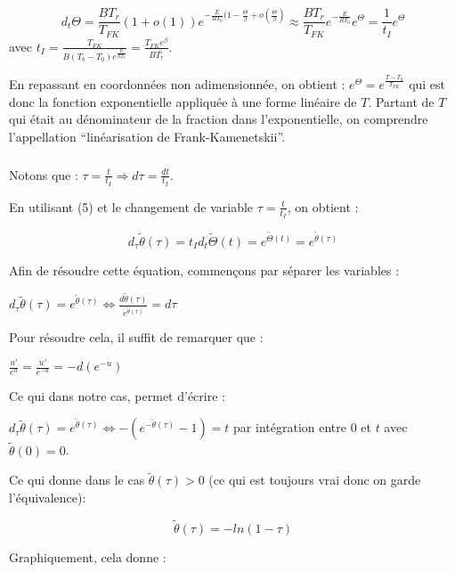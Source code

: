 \documentclass[10pt,a4paper,twocolumn]{report}
\begin{document}
$$ d_t\Theta = \frac{BT_r}{T_{FK}}(1+o(1))e^{-\frac{E}{RT_0}(1-\frac{\Theta}{\beta} + o(\frac{\Theta}{\beta})} \approx \frac{BT_r}{T_{FK}} e^{-\frac{E}{RT_0}} e^{\Theta} = \frac{1}{t_I}e^{\Theta} $$
avec $t_I = \frac{T_{FK}}{B(T_b-T_0)e^{\frac{E}{RT_0}}} = \frac{T_{FK}e^{\beta}}{B\bar{T_r}} $.

En repassant en coordonnées non adimensionnée, on obtient : $e^{\Theta} = e^{\frac{T-T_0}{T_{FK}}}$ qui est donc la fonction exponentielle appliquée à une forme linéaire de $T$. Partant de $T$ qui était au dénominateur de la fraction dans l'exponentielle, on comprendre l'appellation “linéarisation de Frank-Kamenetskii”.

\subsubsection{} %

Notons que : $\tau = \frac{t}{t_I} \Rightarrow d\tau = \frac{dt}{t_I} $.

En utilisant (5) et le changement de variable $\tau = \frac{t}{t_I}$, on obtient : 

$$ d_{\tau}\tilde{\theta}(\tau) = t_I d_{t}\tilde{\Theta}(t) = e^{\tilde{\Theta}(t)} = e^{\tilde{\theta}(\tau)} $$

Afin de résoudre cette équation, commençons par séparer les variables : 

$ d_{\tau}\tilde{\theta}(\tau) = e^{\tilde{\theta}(\tau)} \Leftrightarrow \frac{d\tilde{\theta}(\tau)}{e^{\tilde{\theta}(\tau)} } = d\tau $

Pour résoudre cela, il suffit de remarquer que :

$ \frac{u'}{e^u} = \frac{u'}{e^{-u}} = - d(e^{-u})$

Ce qui dans notre cas, permet d'écrire :

$ d_{\tau}\tilde{\theta}(\tau) = e^{\tilde{\theta}(\tau)} \Leftrightarrow  - (e^{-\tilde{\theta}(\tau)} - 1) = t $ par intégration entre $0$ et $t$ avec $\tilde{\theta}(0) = 0$.

Ce qui donne dans le cas $\tilde{\theta}(\tau) > 0$ (ce qui est toujours vrai donc on garde l'équivalence):  

$$\tilde{\theta}(\tau) = - ln(1-\tau)$$

Graphiquement, cela donne :


\end{document}
